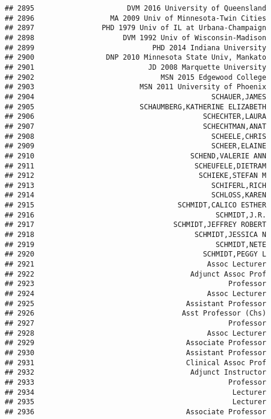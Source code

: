 \documentclass[
]{article}
\begin{document}
\begin{verbatim}
## 2895                      DVM 2016 University of Queensland
## 2896                  MA 2009 Univ of Minnesota-Twin Cities
## 2897                PHD 1979 Univ of IL at Urbana-Champaign
## 2898                     DVM 1992 Univ of Wisconsin-Madison
## 2899                            PHD 2014 Indiana University
## 2900                 DNP 2010 Minnesota State Univ, Mankato
## 2901                           JD 2008 Marquette University
## 2902                              MSN 2015 Edgewood College
## 2903                         MSN 2011 University of Phoenix
## 2904                                          SCHAUER,JAMES
## 2905                         SCHAUMBERG,KATHERINE ELIZABETH
## 2906                                        SCHECHTER,LAURA
## 2907                                        SCHECHTMAN,ANAT
## 2908                                          SCHEELE,CHRIS
## 2909                                          SCHEER,ELAINE
## 2910                                     SCHEND,VALERIE ANN
## 2911                                      SCHEUFELE,DIETRAM
## 2912                                       SCHIEKE,STEFAN M
## 2913                                          SCHIFERL,RICH
## 2914                                          SCHLOSS,KAREN
## 2915                                  SCHMIDT,CALICO ESTHER
## 2916                                           SCHMIDT,J.R.
## 2917                                 SCHMIDT,JEFFREY ROBERT
## 2918                                      SCHMIDT,JESSICA N
## 2919                                           SCHMIDT,NETE
## 2920                                        SCHMIDT,PEGGY L
## 2921                                         Assoc Lecturer
## 2922                                     Adjunct Assoc Prof
## 2923                                              Professor
## 2924                                         Assoc Lecturer
## 2925                                    Assistant Professor
## 2926                                   Asst Professor (Chs)
## 2927                                              Professor
## 2928                                         Assoc Lecturer
## 2929                                    Associate Professor
## 2930                                    Assistant Professor
## 2931                                    Clinical Assoc Prof
## 2932                                     Adjunct Instructor
## 2933                                              Professor
## 2934                                               Lecturer
## 2935                                               Lecturer
## 2936                                    Associate Professor

\end{verbatim}
\end{document}
